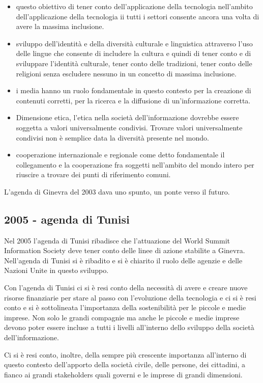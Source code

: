 \begin{itemize}
    \item questo obiettivo di tener conto dell'applicazione della tecnologia nell'ambito dell'applicazione della tecnologia ii tutti i settori consente ancora una volta di avere la massima inclusione.
    \item sviluppo dell'identità e della diversità culturale e linguistica attraverso l'uso delle lingue che consente di includere la cultura e quindi di tener conto e di sviluppare l'identità culturale, tener conto delle tradizioni, tener conto delle religioni senza escludere nessuno in un concetto di massima inclusione.
    \item i media hanno un ruolo fondamentale in questo contesto per la creazione di contenuti corretti, per la ricerca e la diffusione di un'informazione corretta.
    \item Dimensione etica, l'etica nella società dell'informazione dovrebbe essere soggetta a valori universalmente condivisi. Trovare valori universalmente condivisi non è semplice data la diversità presente nel mondo.
    \item cooperazione internazionale e regionale come detto fondamentale il collegamento e la cooperazione fra soggetti nell'ambito del mondo intero per riuscire a trovare dei punti di riferimento comuni.
\end{itemize}


L'agenda di Ginevra del 2003 dava uno spunto, un ponte verso il futuro.

\subsection{2005 - agenda di Tunisi}

Nel 2005 l'agenda di Tunisi ribadisce che l'attuazione del World Summit Information Society deve tener conto delle linee di azione stabilite a Ginevra. Nell'agenda di Tunisi si è ribadito e si è chiarito il ruolo delle agenzie e delle Nazioni Unite in questo sviluppo. \par
Con l'agenda di Tunisi ci si è resi conto della necessità di avere e creare nuove risorse finanziarie per stare al passo con l'evoluzione della tecnologia e ci si è resi conto e si è sottolineata l'importanza della sostenibilità per le piccole e medie imprese. Non solo le grandi compagnie ma anche le piccole e medie imprese devono poter essere incluse a tutti i livelli all'interno dello sviluppo della società dell'informazione.\par
Ci si è resi conto, inoltre, della sempre più crescente importanza all'interno di questo contesto dell'apporto della società civile, delle persone, dei cittadini, a fianco ai grandi stakeholders quali governi e le imprese di grandi dimensioni.

